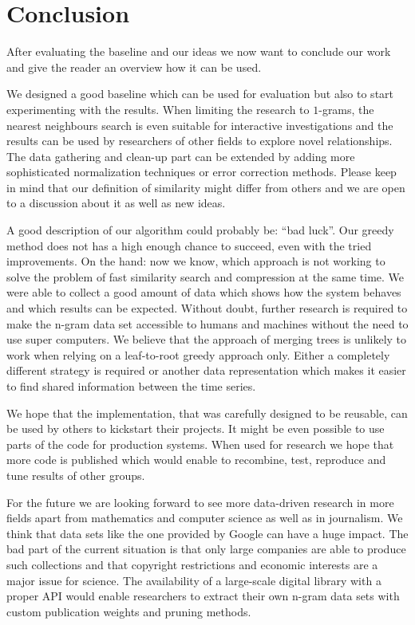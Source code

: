 \chapter{Conclusion}
\label{ch:Conclusion}

After evaluating the baseline and our ideas we now want to conclude our work and give the reader an overview how it can be used.

We designed a good baseline which can be used for evaluation but also to start experimenting with the results. When limiting the research to $1$-grams, the nearest neighbours search is even suitable for interactive investigations and the results can be used by researchers of other fields to explore novel relationships. The data gathering and clean-up part can be extended by adding more sophisticated normalization techniques or error correction methods. Please keep in mind that our definition of similarity might differ from others and we are open to a discussion about it as well as new ideas.

A good description of our algorithm could probably be: \enquote{bad luck}. Our greedy method does not has a high enough chance to succeed, even with the tried improvements. On the hand: now we know, which approach is not working to solve the problem of fast similarity search and compression at the same time. We were able to collect a good amount of data which shows how the system behaves and which results can be expected. Without doubt, further research is required to make the n-gram data set accessible to humans and machines without the need to use super computers. We believe that the approach of merging trees is unlikely to work when relying on a leaf-to-root greedy approach only. Either a completely different strategy is required or another data representation which makes it easier to find shared information between the time series.

We hope that the implementation, that was carefully designed to be reusable, can be used by others to kickstart their projects. It might be even possible to use parts of the code for production systems. When used for research we hope that more code is published which would enable to recombine, test, reproduce and tune results of other groups.

For the future we are looking forward to see more data-driven research in more fields apart from mathematics and computer science as well as in journalism. We think that data sets like the one provided by Google can have a huge impact. The bad part of the current situation is that only large companies are able to produce such collections and that copyright restrictions and economic interests are a major issue for science. The availability of a large-scale digital library with a proper API would enable researchers to extract their own n-gram data sets with custom publication weights and pruning methods.

